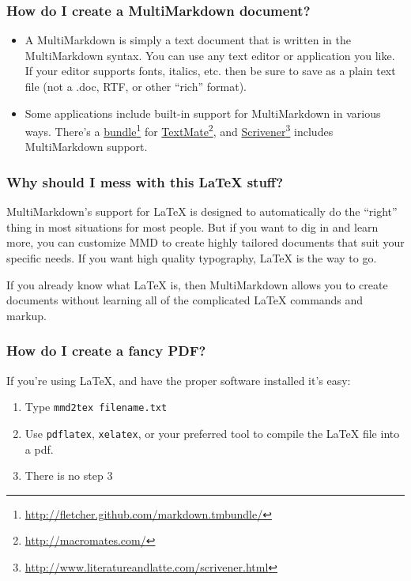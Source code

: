 \begin{frame}[fragile]
\frametitle{How do I create a MultiMarkdown document? }
\label{howdoicreateamultimarkdowndocument}

\begin{itemize}
\item{} A MultiMarkdown is simply a text document that is written in the
MultiMarkdown syntax. You can use any text editor or application you like.
If your editor supports fonts, italics, etc. then be sure to save as a plain
text file (not a .doc, RTF, or other ``rich'' format).

\item{} Some applications include built-in support for MultiMarkdown in various
ways. There's a \href{http://fletcher.github.com/markdown.tmbundle/}{bundle}\footnote{\href{http://fletcher.github.com/markdown.tmbundle/}{http:\slash \slash fletcher.github.com\slash markdown.tmbundle\slash }} for \href{http://macromates.com/}{TextMate}\footnote{\href{http://macromates.com/}{http:\slash \slash macromates.com\slash }}, and \href{http://www.literatureandlatte.com/scrivener.html}{Scrivener}\footnote{\href{http://www.literatureandlatte.com/scrivener.html}{http:\slash \slash www.literatureandlatte.com\slash scrivener.html}} includes
MultiMarkdown support.

\end{itemize}

\end{frame}

\begin{frame}[fragile]
\frametitle{Why should I mess with this LaTeX stuff? }
\label{whyshouldimesswiththislatexstuff}

MultiMarkdown's support for LaTeX is designed to automatically do the ``right''
thing in most situations for most people. But if you want to dig in and learn
more, you can customize MMD to create highly tailored documents that suit your
specific needs. If you want high quality typography, LaTeX is the way to go.

If you already know what LaTeX is, then MultiMarkdown allows you to create
documents without learning all of the complicated LaTeX commands and markup.

\end{frame}

\begin{frame}[fragile]
\frametitle{How do I create a fancy PDF? }
\label{howdoicreateafancypdf}

If you're using LaTeX, and have the proper software installed it's easy:

\begin{enumerate}
\item{} Type \texttt{mmd2tex filename.txt}

\item{} Use \texttt{pdflatex}, \texttt{xelatex}, or your preferred tool to compile the LaTeX
file into a pdf.

\item{} There is no step 3

\end{enumerate}

\end{frame}

